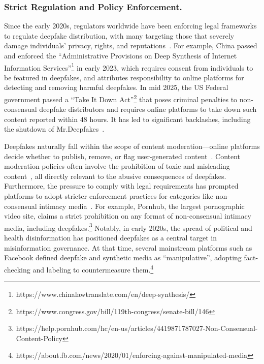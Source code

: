 
\subsubsection{Strict Regulation and Policy Enforcement.} Since the early 2020s, regulators worldwide have been enforcing legal frameworks to regulate deepfake distribution, with many targeting those that severely damage individuals' privacy, rights, and reputations~\cite{mania2024legal, geng2023comparing}. For example, China passed and enforced the ``Administrative Provisions on Deep Synthesis of Internet Information Services''\footnote {https://www.chinalawtranslate.com/en/deep-synthesis/} in early 2023, which requires consent from individuals to be featured in deepfakes, and attributes responsibility to online platforms for detecting and removing harmful deepfakes. In mid 2025, the US Federal government passed a ``Take It Down Act''\footnote{https://www.congress.gov/bill/119th-congress/senate-bill/146} that poses criminal penalties to non-consensual deepfake distributors and requires online platforms to take down such content reported within 48 hours. It has led to significant backlashes, including the shutdown of Mr.Deepfakes~\cite{cuevas2026deepfake, CBS_MrDeepfakes_Shutdown_2025}.

Deepfakes naturally fall within the scope of content moderation---online platforms decide whether to publish, remove, or flag user-generated content~\cite{kiesler2012regulating}. Content moderation policies often involve the prohibition of toxic and misleading content~\cite{schaffner2024community,singhal2023sok}, all directly relevant to the abusive consequences of deepfakes. Furthermore, the pressure to comply with legal requirements has prompted platforms to adopt stricter enforcement practices for categories like non-consensual intimacy media~\cite{batool2025between, lapointe2026governance}. For example, Pornhub, the largest pornographic video site, claims a strict prohibition on any format of non-consensual intimacy media, including deepfakes.\footnote{https://help.pornhub.com/hc/en-us/articles/4419871787027-Non-Consensual-Content-Policy} Notably, in early 2020s, the spread of political and health disinformation has positioned deepfakes as a central target in misinformation governance. At that time, several mainstream platforms such as Facebook defined deepfake and synthetic media as ``manipulative'', adopting fact-checking and labeling to countermeasure them.\footnote{https://about.fb.com/news/2020/01/enforcing-against-manipulated-media}

